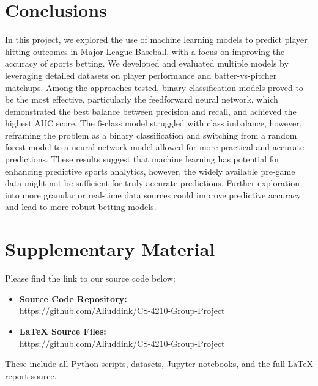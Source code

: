 \documentclass[conference]{IEEEtran}
\begin{document}
\section{Conclusions}
In this project, we explored the use of machine learning models to predict player hitting outcomes in Major League Baseball, with a focus on improving the accuracy of sports betting. We developed and evaluated multiple models by leveraging detailed datasets on player performance and batter-vs-pitcher matchups. Among the approaches tested, binary classification models proved to be the most effective, particularly the feedforward neural network, which demonstrated the best balance between precision and recall, and achieved the highest AUC score. The 6-class model struggled with class imbalance, however, reframing the problem as a binary classification and switching from a random forest model to a neural network model allowed for more practical and accurate predictions. These results suggest that machine learning has potential for enhancing predictive sports analytics, however, the widely available pre-game data might not be sufficient for truly accurate predictions. Further exploration into more granular or real-time data sources could improve predictive accuracy and lead to more robust betting models.

\section*{Supplementary Material}

Please find the link to our source code below:

\begin{itemize}
    \item \textbf{Source Code Repository:} \\
    \url{https://github.com/Aliuddink/CS-4210-Group-Project}

    \item \textbf{LaTeX Source Files:} \\
    \url{https://github.com/Aliuddink/CS-4210-Group-Project}
\end{itemize}

These include all Python scripts, datasets, Jupyter notebooks, and the full LaTeX report source.

\end{document}
